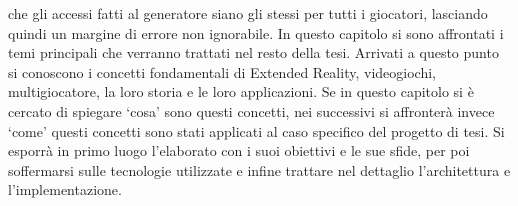             che gli accessi fatti al generatore siano gli stessi per tutti i giocatori, lasciando quindi un margine di errore non ignorabile.
    \newline \newline
    In questo capitolo si sono affrontati i temi principali che verranno trattati nel resto della tesi. Arrivati a questo punto si conoscono i concetti fondamentali di 
    Extended Reality, videogiochi, multigiocatore, la loro storia e le loro applicazioni. Se in questo capitolo si è cercato di spiegare `cosa' sono questi concetti, 
    nei successivi si affronterà invece `come' questi concetti sono stati applicati al caso specifico del progetto di tesi. Si esporrà in primo luogo l'elaborato con i suoi obiettivi
    e le sue sfide, per poi soffermarsi sulle tecnologie utilizzate e infine trattare nel dettaglio l'architettura e l'implementazione.